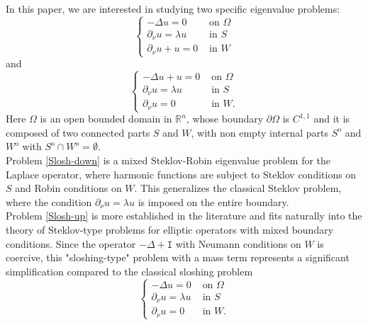 \documentclass[a4paper,reqno,11pt,oneside]{amsart}
\theoremstyle{plain}
\theoremstyle{plain}
\theoremstyle{plain}
\theoremstyle{remark}
\begin{document}
In this paper, we are interested in studying two specific eigenvalue problems:
\begin{equation}\label{Slosh-down}  
   \left\{
    \begin{array}{cc}
         -\Delta u=0& \text{ on } \Omega\\
        \partial_\nu u=\lambda u & \text{ in } S\\
        \partial_\nu u +u=0 & \text{ in }  W
    \end{array}
    \right.
\end{equation}
and 
\begin{equation}\label{Slosh-up}  
   \left\{
    \begin{array}{cc}
         -\Delta u+u=0& \text{ on } \Omega\\
        \partial_\nu u=\lambda u & \text{ in } S\\
        \partial_\nu u=0 & \text{ in }  W.
    \end{array}
    \right.
\end{equation}
Here $\Omega$ is an open bounded domain in $\mathbb{R}^n$, whose boundary $\partial \Omega $ is $C^{1,1}$ and it is composed of two connected parts $S$ and $W$, with non empty internal parts  $S^{\mathrm{o}}$ and $W^{\mathrm{o}}$ with  $S^{\mathrm{o}}\cap W^{\mathrm{o}}=\emptyset$. 
\\



Problem \eqref{Slosh-down} is a mixed Steklov-Robin eigenvalue problem for the Laplace operator, where harmonic functions are subject to Steklov conditions on $S$ and Robin conditions on $W$. This generalizes the classical Steklov problem, where the condition $\partial_\nu u = \lambda u$ is imposed on the entire boundary.\\
Problem \eqref{Slosh-up} is more established in the literature and fits naturally into the theory of Steklov-type problems for elliptic operators with mixed boundary conditions. Since the operator $-\Delta + \mathtt{I}$ with Neumann conditions on $W$ is coercive, this "sloshing-type" problem with a mass term represents a significant simplification compared to the classical sloshing problem
\begin{equation}\label{slosh}
   \left\{    \begin{array}{cc}
         -\Delta u =0& \text{ on } \Omega\\
        \partial_\nu u=\lambda u & \text{ in } S\\
        \partial_\nu u=0 & \text{ in }  W.
    \end{array}\right.
\end{equation}
\end{document}
